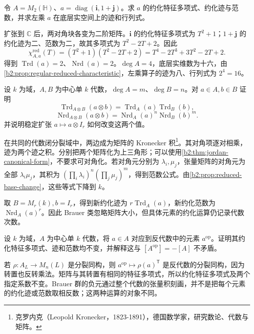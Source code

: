\begin{exercise}\label{b2:ex:18-quaternion-block-reduced-polynomial}
	令 \(A=M_2(\mathbb H)\)、\(a=\operatorname{diag}(\mathbf i,1+\mathbf j)\)。求 \(a\) 的约化特征多项式、约化迹与范数，并求左乘 \(a\) 在底层实空间上的迹和行列式。
\end{exercise}
\begin{solution}
	扩张到 \(\mathbb C\) 后，两对角块各变为二阶矩阵。\(\mathbf i\) 的约化特征多项式为 \(T^2+1\)；\(1+\mathbf j\) 的约化迹为二、范数为二，故其多项式为 \(T^2-2T+2\)。因此
	\[
		\chi^{\mathrm{red}}_{A,a}(T) =(T^2+1)(T^2-2T+2) =T^4-2T^3+3T^2-2T+2.
	\]
	得到 \(\operatorname{Trd}(a)=2\)、\(\operatorname{Nrd}(a)=2\)。\(\deg A=4\)，底层实维数为十六，由\cref{b2:prop:regular-reduced-characteristic}，左乘算子的迹为八、行列式为 \(2^4=16\)。
\end{solution}

\begin{exercise}\label{b2:ex:18-reduced-tensor-formulas}
	设 \(k\) 为域，\(A,B\) 为中心单 \(k\) 代数，\(\deg A=m\)、\(\deg B=n\)。对 \(a\in A,b\in B\) 证明
	\[
		\operatorname{Trd}_{A\otimes B}(a\otimes b) =\operatorname{Trd}_A(a)\operatorname{Trd}_B(b),
	\]
	\[
		\operatorname{Nrd}_{A\otimes B}(a\otimes b) =\operatorname{Nrd}_A(a)^n\operatorname{Nrd}_B(b)^m.
	\]
	并说明稳定扩张 \(a\mapsto a\otimes I_r\) 如何改变这两个值。
\end{exercise}
\begin{solution}
	在共同的代数闭分裂域中，两边成为矩阵的 Kronecker 积\footnote{克罗内克（Leopold Kronecker，1823-1891），德国数学家，研究数论、代数与矩阵。}。其对角项逐对相乘，迹为两个迹之积。分别把两个矩阵化为上三角形；可以使用\cref{b2:thm:jordan-canonical-form}，不要求可对角化。若对角元分别为 \(\lambda_i,\mu_j\)，张量矩阵的对角元为全部 \(\lambda_i\mu_j\)，其积为 \((\prod_i\lambda_i)^n(\prod_j\mu_j)^m\)，得到范数公式。由\cref{b2:prop:reduced-base-change}，这些等式下降到 \(k\)。

	取 \(B=M_r(k),b=I_r\)，得到新约化迹为 \(r\operatorname{Trd}_A(a)\)，新约化范数为 \(\operatorname{Nrd}_A(a)^r\)。因此 Brauer 类忽略矩阵大小，但具体元素的约化运算仍记录代数次数。
\end{solution}

\begin{exercise}\label{b2:ex:18-opposite-reduced-polynomial}
	设 \(k\) 为域，\(A\) 为中心单 \(k\) 代数，将 \(a\in A\) 对应到反代数中的元素 \(a^{\mathrm{op}}\)。证明其约化特征多项式、迹和范数均不变，并解释这与 \([A^{\mathrm{op}}]=-[A]\) 不矛盾。
\end{exercise}
\begin{solution}
	若 \(\rho:A_L\to M_n(L)\) 是分裂同构，则 \(a^{\mathrm{op}}\mapsto\rho(a)^{\mathsf T}\) 是反代数的分裂同构，因为转置也反转乘法。矩阵与其转置有相同的特征多项式，所以约化特征多项式及两个指定系数不变。Brauer 群的负元通过整个代数的张量积刻画，并不是把每个元素的约化迹或范数取相反数；这两种运算的对象不同。
\end{solution}

